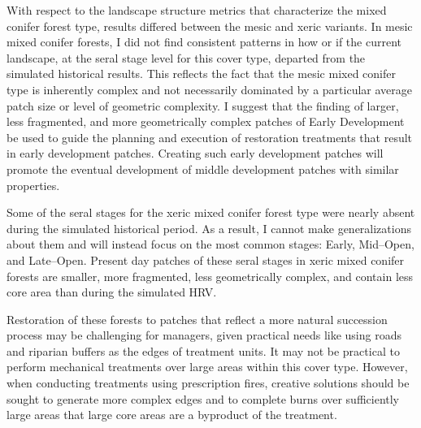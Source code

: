 With respect to the landscape structure metrics that characterize the mixed conifer forest type, results differed between the mesic and xeric variants. In mesic mixed conifer forests, I did not find consistent patterns in how or if the current landscape, at the seral stage level for this cover type, departed from the simulated historical results. This reflects the fact that the mesic mixed conifer type is inherently complex and not necessarily dominated by a particular average patch size or level of geometric complexity. I suggest that the finding of larger, less fragmented, and more geometrically complex patches of Early Development be used to guide the planning and execution of restoration treatments that result in early development patches. Creating such early development patches will promote the eventual development of middle development patches with similar properties. 

Some of the seral stages for the xeric mixed conifer forest type were nearly absent during the simulated historical period. As a result, I cannot make generalizations about them and will instead focus on the most common stages: Early, Mid--Open, and Late--Open. Present day patches of these seral stages in xeric mixed conifer forests are smaller, more fragmented, less geometrically complex, and contain less core area than during the simulated HRV. 

Restoration of these forests to patches that reflect a more natural succession process may be challenging for managers, given practical needs like using roads and riparian buffers as the edges of treatment units. It may not be practical to perform mechanical treatments over large areas within this cover type. However, when conducting treatments using prescription fires, creative solutions should be sought to generate more complex edges and to complete burns over sufficiently large areas that large core areas are a byproduct of the treatment.











